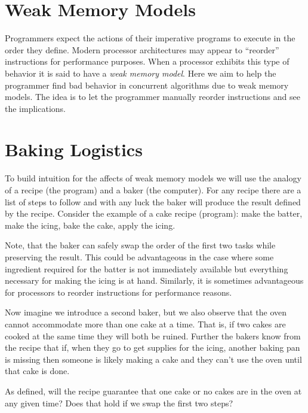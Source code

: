 \documentclass[9pt,twocolumn]{extarticle}
\begin{document}
\section{Weak Memory Models}
\vspace{-0.25cm}
Programmers expect the actions of their imperative programs to execute in the order they define. Modern processor architectures may appear to ``reorder'' instructions for performance purposes. When a processor exhibits this type of behavior it is said to have a \textit{weak memory model}. Here we aim to help the programmer find bad behavior in concurrent algorithms due to weak memory models. The idea is to let the programmer manually reorder instructions and see the implications.

\vspace{-0.35cm}
\section{Baking Logistics}
\vspace{-0.25cm}

To build intuition for the affects of weak memory models we will use the analogy of a recipe (the program) and a baker (the computer). For any recipe there are a list of steps to follow and with any luck the baker will produce the result defined by the recipe. Consider the example of a cake recipe (program): make the batter, make the icing, bake the cake, apply the icing.

Note, that the baker can safely swap the order of the first two tasks while preserving the result. This could be advantageous in the case where some ingredient required for the batter is not immediately available but everything necessary for making the icing is at hand. Similarly, it is sometimes advantageous for processors to reorder instructions for performance reasons.

Now imagine we introduce a second baker, but we also observe that the oven cannot accommodate more than one cake at a time. That is, if two cakes are cooked at the same time they will both be ruined. Further the bakers know from the recipe that if, when they go to get supplies for the icing, another baking pan is missing then someone is likely making a cake and they can't use the oven until that cake is done.

As defined, will the recipe guarantee that one cake or no cakes are in the oven at any given time? Does that hold if we swap the first two steps?
\end{document}
